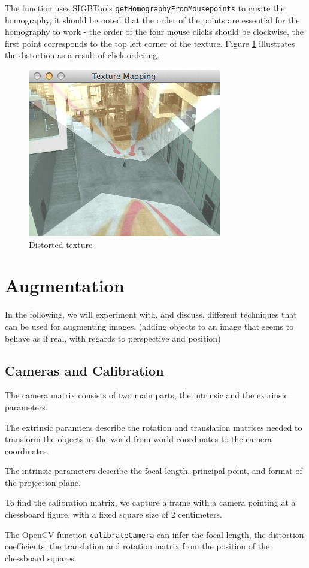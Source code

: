 \documentclass[a4paper,11pt]{article}
\begin{document}
\noindent
The function uses SIGBTools \texttt{getHomographyFromMousepoints} to create the homography, it should be noted that the order of the points are essential for the homography to work - the order of the four mouse clicks should be clockwise, the first point corresponds to the top left corner of the texture. Figure \ref{fig:floor_fail} illustrates the distortion as a result of click ordering.

\begin{figure}[H]
\centering
\includegraphics[width=0.32\linewidth]{floor_fail}
\caption{Distorted texture}
\label{fig:floor_fail}
\end{figure}




\section{Augmentation}
\label{sec:aug}
In the following, we will experiment with, and discuss, different techniques that can be used for augmenting images. (adding objects to an image that seems to behave as if real, with regards to perspective and position)
\subsection{Cameras and Calibration}
The camera matrix consists of two main parts, the intrinsic and the extrinsic parameters.

The extrinsic paramters describe the rotation and translation matrices needed to transform the objects in the world from world coordinates to the camera coordinates.

The intrinsic parameters describe the focal length, principal point, and format of the projection plane.

To find the calibration matrix, we capture a frame with a camera pointing at a chessboard figure, with a fixed square size of 2 centimeters.

The OpenCV function \texttt{calibrateCamera} can infer the focal length, the distortion coefficients, the translation and rotation matrix from the position of the chessboard squares.
\end{document}
